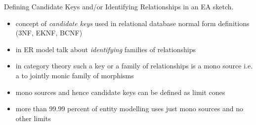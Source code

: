 \iffalse %
\begin{frame}{Normalisation}
\begin{definition}
{ \footnotesize
If $T$ is a theory and $W \subset |Mod(T,FinSet)|$ is an intended usage then an interpretation (theory morphism) $I: T \morph T'$ is an improvement of $T$ wrt $W$ iff 
$Mod(I,Finset): Mod(U',Finset) \morph Mod(U,Finset)$ is injective but not surjective
and $W \subseteq img(Mod(I,Finset))$.
i.e. for all models $U \in W$ there exists $U' \in Mod(T,Finset)$ such that $I \circ U'=U$
$
\begin{array} {c p{2cm} c}
\Rnode{T}{T} && \\ [0.25cm]
             && \Rnode{finset}{Finset} \\ [0.25cm]
\Rnode{Tp}{T'}  
\end{array}
$
\ncarr {T}{finset}
\alabel{U}
\ncarr{T}{Tp}
\blabel{I}
\ncarr{Tp}{finset}
\blabel{U'} 
}
\end{definition}

\begin{definition}
If a theory $T$ has no improvement wrt to an intended usage $W$ then $T$ is said to be \textit{optimally formulated} wrt $W$.
\end{definition}
\end{frame}


\begin{frame}{Propositions}
\begin{itemize}
\item If a relational schema $R$ can be normalised to $R'$ then the associated theory $T$ of $R$ can be improved to the associated thery $T'$ of $R'$.

\item If a relational database schema is in normal form then its associated theory is optimally formulated.
\end{itemize}
\end{frame} 
\fi

\begin{frame}{Defining Candidate Keys and/or Identifying Relationships in an EA sketch.  }
\begin{itemize}
\item concept of \textit{candidate keys} used in relational database normal form definitions {\scriptsize (3NF, EKNF, BCNF)}
\item in ER model talk about \textit{identifying} families of relationships
\item in category theory such a key or a family of relationships is a mono source i.e. a to jointly monic family of morphisms
\item mono sources and hence candidate keys can be defined as limit cones
\item more than 99.99 percent of entity modelling uses just mono sources and no other limits
\end{itemize}
\end{frame}

